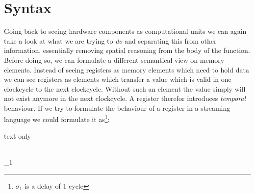 \newcommand{\framedhslinecorrect}[2]%
  {#1[#2]}

\newcommand{\framedhs}{\sethscode{framedhscode}}


\newenvironment{inlinehscode}%
  {\(\def\column##1##2{}%
   \let\>\undefined\let\<\undefined\let\\\undefined
   \newcommand\>[1][]{}\newcommand\<[1][]{}\newcommand\\[1][]{}%
   \def\fromto##1##2##3{##3}%
   \def\nextline{}}{\) }%

\newcommand{\inlinehs}{\sethscode{inlinehscode}}


\newenvironment{joincode}%
  {\let\orighscode=\hscode
   \let\origendhscode=\endhscode
   \def\endhscode{\def\hscode{\endgroup\def\@currenvir{hscode}\\}\begingroup}
   \orighscode\def\hscode{\endgroup\def\@currenvir{hscode}}}%
  {\origendhscode
   \global\let\hscode=\orighscode
   \global\let\endhscode=\origendhscode}%

\makeatother
\EndFmtInput
%

\chapter{Syntax}
Going back to seeing hardware components as computational units  we can again take a look at what we are trying to \textit{do} and separating this from other information, essentially removing spatial reasoning from the body of the function.
Before doing so, we can formulate a different semantical view on memory elements.
Instead of seeing registers as memory elements which need to hold data we can see registers as elements which transfer a value which is valid in one clockcycle to the next clockcycle. 
Without such an element the value simply will not exist anymore in the next clockcycle.
A register therefor introduces \textit{temporal} behaviour.
If we try to formulate the behaviour of a register in a streaming language we could formulate it as\footnote{\ensuremath{\sigma_1} is a delay of 1 cycle}:
\begin{texexp}{text only}
\begin{hscode}\SaveRestoreHook
{}%
%
\>[B]{}\mathbin{::}\to {}\<[E]%
\\
\>[B]{}\mathrel{=}\sigma_1{}\<[E]%
\ColumnHook
\end{hscode}\resethooks
\end{texexp}


